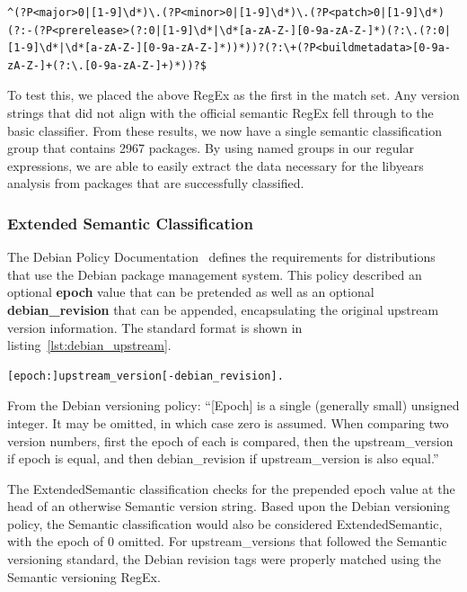 \documentclass[sn-mathphys-num]{sn-jnl}%
\theoremstyle{thmstyleone}%
\theoremstyle{thmstyletwo}%
\theoremstyle{thmstylethree}%
\begin{document}
\begin{lstlisting}[caption={Semantic Version Regular expression},captionpos=b, label=lst:regular_expression]
^(?P<major>0|[1-9]\d*)\.(?P<minor>0|[1-9]\d*)\.(?P<patch>0|[1-9]\d*)(?:-(?P<prerelease>(?:0|[1-9]\d*|\d*[a-zA-Z-][0-9a-zA-Z-]*)(?:\.(?:0|[1-9]\d*|\d*[a-zA-Z-][0-9a-zA-Z-]*))*))?(?:\+(?P<buildmetadata>[0-9a-zA-Z-]+(?:\.[0-9a-zA-Z-]+)*))?$
\end{lstlisting}

To test this, we placed the above RegEx as the first in the match set. Any version strings that did not align with the official semantic RegEx fell through to the basic classifier. From these results, we now have a single semantic classification group that contains 2967 packages. By using named groups in our regular expressions, we are able to easily extract the data necessary for the libyears analysis from packages that are successfully classified.

\subsubsection{\textbf{Extended Semantic Classification}}

The Debian Policy Documentation~\cite{noauthor_5_nodate} defines the requirements for distributions that use the Debian package management system. This policy described an optional \textbf{epoch} value that can be pretended as well as an optional \textbf{debian\_revision} that can be appended, encapsulating the original upstream version information. The standard format is shown in listing~\ref{lst:debian_upstream}.

\begin{lstlisting}[caption={Debain Extended Version Format},captionpos=b, label=lst:debian_upstream]
[epoch:]upstream_version[-debian_revision].
\end{lstlisting}

From the Debian versioning policy: ``[Epoch] is a single (generally small) unsigned integer. It may be omitted, in which case zero is assumed. When comparing two version numbers, first the epoch of each is compared, then the upstream\_version if epoch is equal, and then debian\_revision if upstream\_version is also equal.''~\cite{noauthor_5_nodate}

The ExtendedSemantic classification checks for the prepended epoch value at the head of an otherwise Semantic version string. Based upon the Debian versioning policy, the Semantic classification would also be considered ExtendedSemantic, with the epoch of 0 omitted. For upstream\_versions that followed the Semantic versioning standard, the Debian revision tags were properly matched using the Semantic versioning RegEx.
\end{document}
